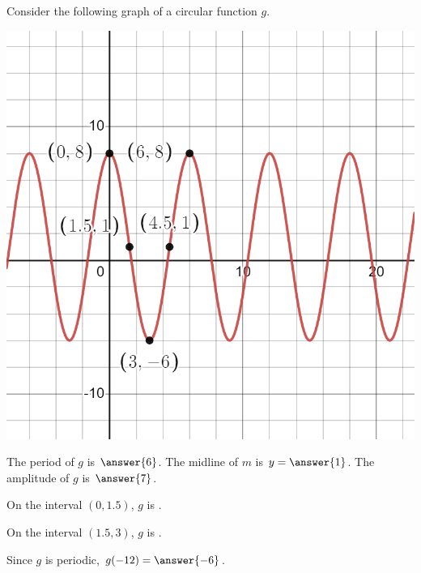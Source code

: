\documentclass{ximera}
\author{Kenneth Berglund}
\begin{document}
\begin{exercise}
Consider the following graph of a circular function $g$.

\includegraphics[width=1\linewidth]{ex12.png}

The period of $g$ is $\answer{6}$. The midline of $m$ is $y = \answer{1}$. The amplitude of $g$ is $\answer{7}$.

On the interval $(0, 1.5)$, $g$ is .

On the interval $(1.5, 3)$, $g$ is .

Since $g$ is periodic, $g(-12) = \answer{-6}$. 


\end{exercise}
\end{document}
